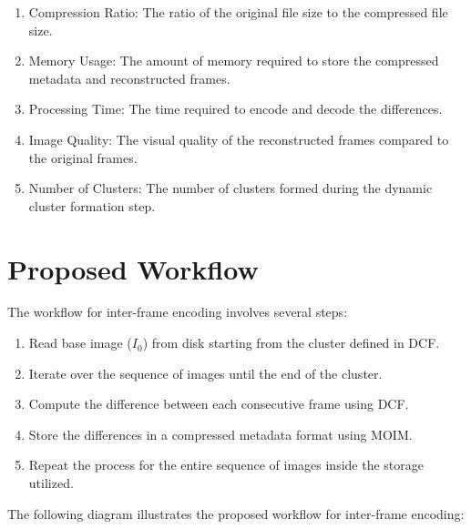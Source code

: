 \documentclass[twocolumn]{article}
\begin{document}
\begin{enumerate}
    \item Compression Ratio: The ratio of the original file size to the compressed file size.
    \item Memory Usage: The amount of memory required to store the compressed metadata and reconstructed frames.
    \item Processing Time: The time required to encode and decode the differences.
    \item Image Quality: The visual quality of the reconstructed frames compared to the original frames.
    \item Number of Clusters: The number of clusters formed during the dynamic cluster formation step.
\end{enumerate}

\section{Proposed Workflow}
The workflow for inter-frame encoding involves several steps:
\begin{enumerate}
    \item Read base image ($I_{0}$) from disk starting from the cluster defined in DCF.
    \item Iterate over the sequence of images until the end of the cluster.
    \item Compute the difference between each consecutive frame using DCF.
    \item Store the differences in a compressed metadata format using MOIM.
    \item Repeat the process for the entire sequence of images inside the storage utilized.
\end{enumerate}

The following diagram illustrates the proposed workflow for inter-frame encoding:
\end{document}
